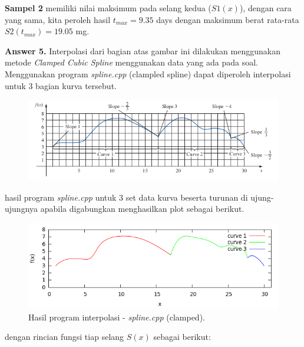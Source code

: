 \documentclass[paper=a4, fontsize=11pt]{scrartcl}
\numberwithin{equation}{section} %
\numberwithin{figure}{section} %
\numberwithin{table}{section} %
\begin{document}
\textbf{Sampel 2} memiliki nilai maksimum pada selang kedua ($S1(x)$), dengan cara yang sama, kita peroleh hasil $t_{max} = 9.35$ days dengan maksimum berat rata-rata $S2(t_{max}) = 19.05$ mg.

\newpage
\large \textbf{Answer 5.}
Interpolasi dari bagian atas gambar ini dilakukan menggunakan metode \textit{Clamped Cubic Spline} menggunakan data yang ada pada soal. Menggunakan program \textit{spline.cpp} (clampled spline) dapat diperoleh interpolasi untuk 3 bagian kurva tersebut.\\
\begin{figure}
	\centering
	\includegraphics[width=1.0\textwidth]
		{puppy-ini.png}
\end{figure}

hasil program \textit{spline.cpp} untuk 3 set data kurva beserta turunan di ujung-ujungnya apabila digabungkan menghasilkan plot sebagai berikut.
\begin{figure}
	\centering
	\includegraphics[width=1.0\textwidth]
		{curve321.png}
	\caption{Hasil program interpolasi - \textit{spline.cpp} (clamped).}
\end{figure}

dengan rincian fungsi tiap selang $S(x)$ sebagai berikut:\\
\end{document}
